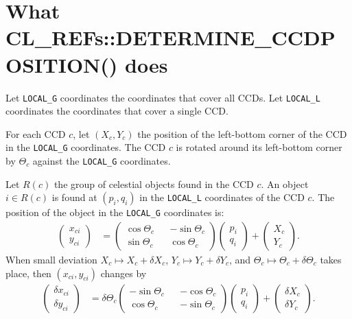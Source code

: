 \documentclass{scrartcl}
\begin{document}
\section*{What CL\_REFs::DETERMINE\_CCDPOSITION() does}

Let \texttt{LOCAL\_G} coordinates the coordinates that cover all CCDs.
Let \texttt{LOCAL\_L} coordinates the coordinates that cover a single CCD.

For each CCD $c$, let $(X_c, Y_c)$ the position of the left-bottom corner of the CCD
in the \texttt{LOCAL\_G} coordinates.
The CCD $c$ is rotated around its left-bottom corner by $\Theta_c$
against the \texttt{LOCAL\_G} coordinates.

Let $R(c)$ the group of celestial objects found in the CCD $c$.
An object $i \in R(c)$ is found at $(p_i, q_i)$ in the \texttt{LOCAL\_L} coordinates
of the CCD $c$. The position of the object in the \texttt{LOCAL\_G} coordinates is:
\begin{align}
    \begin{pmatrix}
        x_{ci} \\ y_{ci}
    \end{pmatrix}
    &= \begin{pmatrix}
        \cos \Theta_c && -\sin \Theta_c
    \\  \sin \Theta_c &&  \cos \Theta_c
    \end{pmatrix}
        \begin{pmatrix}
            p_i \\ q_i
        \end{pmatrix}
        + \begin{pmatrix}
            X_c \\ Y_c
        \end{pmatrix}
    .
\end{align}
When small deviation $X_c \mapsto X_c + \delta X_c$, $Y_c \mapsto Y_c + \delta Y_c$,
and $\Theta_c \mapsto \Theta_c + \delta \Theta_c$ takes place, then $(x_{ci}, y_{ci})$
changes by
\begin{align}
    \begin{pmatrix}
        \delta x_{ci} \\ \delta y_{ci}
    \end{pmatrix}
    &= \delta \Theta_c
        \begin{pmatrix}
            -\sin \Theta_c && -\cos \Theta_c
        \\   \cos \Theta_c && -\sin \Theta_c
        \end{pmatrix}
        \begin{pmatrix}
            p_i \\ q_i
        \end{pmatrix}
        + \begin{pmatrix}
            \delta X_c \\ \delta Y_c
        \end{pmatrix}
    .
\end{align}
\end{document}
